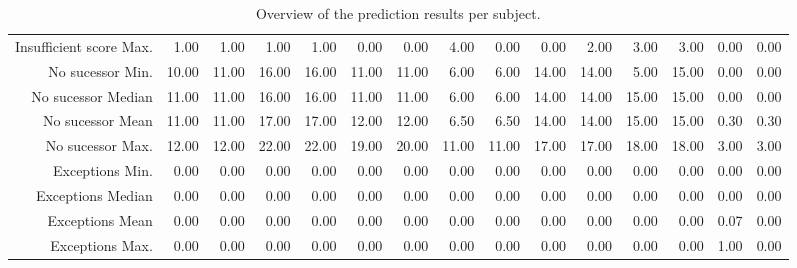 \begin{table}[ht]
\begin{tabular}{rrrrrrrrrrrrrrr}
  Insufficient score Max. & 1.00 & 1.00 & 1.00 & 1.00 & 0.00 & 0.00 & 4.00 & 0.00 & 0.00 & 2.00 & 3.00 & 3.00 & 0.00 & 0.00 \\ 
  No sucessor Min. & 10.00 & 11.00 & 16.00 & 16.00 & 11.00 & 11.00 & 6.00 & 6.00 & 14.00 & 14.00 & 5.00 & 15.00 & 0.00 & 0.00 \\ 
  No sucessor Median & 11.00 & 11.00 & 16.00 & 16.00 & 11.00 & 11.00 & 6.00 & 6.00 & 14.00 & 14.00 & 15.00 & 15.00 & 0.00 & 0.00 \\ 
  No sucessor Mean & 11.00 & 11.00 & 17.00 & 17.00 & 12.00 & 12.00 & 6.50 & 6.50 & 14.00 & 14.00 & 15.00 & 15.00 & 0.30 & 0.30 \\ 
  No sucessor Max. & 12.00 & 12.00 & 22.00 & 22.00 & 19.00 & 20.00 & 11.00 & 11.00 & 17.00 & 17.00 & 18.00 & 18.00 & 3.00 & 3.00 \\ 
  Exceptions Min. & 0.00 & 0.00 & 0.00 & 0.00 & 0.00 & 0.00 & 0.00 & 0.00 & 0.00 & 0.00 & 0.00 & 0.00 & 0.00 & 0.00 \\ 
  Exceptions Median & 0.00 & 0.00 & 0.00 & 0.00 & 0.00 & 0.00 & 0.00 & 0.00 & 0.00 & 0.00 & 0.00 & 0.00 & 0.00 & 0.00 \\ 
  Exceptions Mean & 0.00 & 0.00 & 0.00 & 0.00 & 0.00 & 0.00 & 0.00 & 0.00 & 0.00 & 0.00 & 0.00 & 0.00 & 0.07 & 0.00 \\ 
  Exceptions Max. & 0.00 & 0.00 & 0.00 & 0.00 & 0.00 & 0.00 & 0.00 & 0.00 & 0.00 & 0.00 & 0.00 & 0.00 & 1.00 & 0.00 \\ 
   \hline
\end{tabular}
\caption{Overview of the prediction results per subject.} 
\label{tab:results:rq4:summary:subject:counts}
\end{table}
